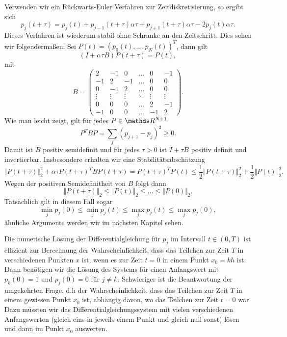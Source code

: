 Verwenden wir ein Rückwarts-Euler Verfahren zur Zeitdiskretisierung, so ergibt sich
$$ p_j(t+\tau ) = p_j(t) + p_{j-1}(t+\tau) \alpha \tau + p_{j+1}(t+\tau) \alpha \tau  -2 p_j(t)  \alpha \tau.$$
Dieses Verfahren ist wiederum stabil ohne Schranke an den Zeitschritt. Dies sehen wir folgenderma{\ss}en: Sei 
$P(t) = (p_0(t),\ldots,p_N(t))^T$, dann gilt
$$ (I + \alpha \tau B) P(t+ \tau) = P(t), $$
mit 
$$ B = \left( \begin{array}{cccccc} 2 & -1 & 0 & \ldots & 0 & -1\\
  -1 &2 & -1 & \ldots & 0 & 0 \\  0 & -1 & 2 & \ldots & 0 & 0 \\
	 \vdots & \vdots & \vdots & \ddots & \vdots & \vdots \\   
	0 & 0 & 0 & \ldots &  2 & -1 \\ 
	-1 & 0 & 0 & \ldots &  -1 & 2  
	\end{array} \right) . $$
Wie man leicht zeigt, gilt für jedes $P \in \R^{N+1}$ 
$$ P^T B P = \sum_j (p_{j+1} - p_j)^2 \geq 0. $$
Damit ist $B$ positiv semidefinit und für jedes $\tau > 0$ ist $I+\tau B$ positiv definit und invertierbar. Insbesondere erhalten wir eine Stabilitätsabschätzung 
$$ \Vert P(t+\tau) \Vert_2^2 +  \alpha \tau P(t+\tau)^T B P(t+\tau) = P(t+\tau)^T P(t) \leq \frac{1}2  \Vert P(t+\tau) \Vert_2^2 + 
\frac{1}2  \Vert P(t) \Vert_2^2. $$
Wegen der positiven Semidefinitheit von $B$ folgt dann
$$ \Vert P(t+\tau) \Vert_2 \leq \Vert P(t ) \Vert_2 \leq \ldots \leq \Vert P(0 ) \Vert_2.$$
Tatsächlich gilt in diesem Fall sogar
$$ \min_j p_j(0) \leq \min_j p_j(t) \leq \max_j p_j(t) \leq \max_j p_j(0), $$
ähnliche Argumente werden wir im nächsten Kapitel sehen. 

Die numerische Lösung der Differentialgleichung für $p_j$ im Intervall $t \in (0,T)$ ist effizient zur Berechnung der Wahrscheinlichkeit, dass das Teilchen zur Zeit $T$ in verschiedenen Punkten $x$ ist, wenn es zur Zeit $t=0$ in einem Punkt $x_0=kh$ ist. Dann benötigen wir die Lösung des Systems für einen Anfangswert mit $p_k(0)=1$ und $p_j(0)=0$ für $j \neq k$. Schwieriger ist die Beantwortung der umgekehrten Frage, d.h der Wahrscheinlichkeit, dass das Teilchen zur Zeit $T$ in einem gewissen Punkt $x_0$ ist, abhängig davon, wo das Teilchen zur Zeit $t=0$ war. Dazu müssten wir das Differentialgleichungssystem mit vielen verschiedenen Anfangswerten (gleich eins in jeweils einem Punkt und gleich null sonst) lösen und dann im Punkt $x_0$ auswerten.  

